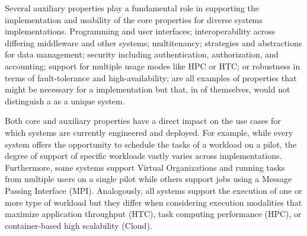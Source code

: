 \documentclass{sig-alternate}
\begin{document}
Several auxiliary properties play a fundamental role in supporting the
implementation and usability of the core properties for diverse \pilot systems
implementations. Programming and user interfaces; interoperability across
differing middleware and other \pilot systems; multitenancy; strategies and
abstractions for data management; security including authentication,
authorization, and accounting; support for multiple usage modes like HPC or HTC;
or robustness in terms of fault-tolerance and high-availability; are all
examples of properties that might be necessary for a \pilot implementation but
that, in of themselves, would not distinguish a \pilot as a unique system.

Both core and auxiliary properties have a direct impact on the use cases for
which \pilot systems are currently engineered and deployed. For example, while
every \pilot system offers the opportunity to schedule the tasks of a workload
on a pilot, the degree of support of specific workloads vastly varies across
implementations. Furthermore, some \pilot systems support Virtual Organizations
and running tasks from multiple users on a single pilot while others support
jobs using a Message Passing Interface (MPI). Analogously, all \pilot systems
support the execution of one or more type of workload but they differ when
considering execution modalities that maximize application throughput (HTC),
task computing performance (HPC), or container-based high scalability (Cloud).
\end{document}
